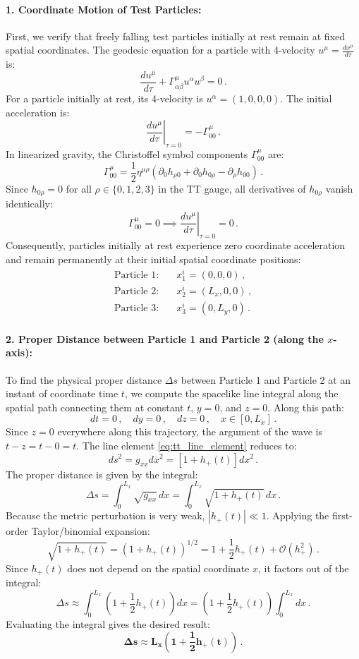 \documentclass[12pt]{article}
\newcommand{\be}{\begin{equation}}
\newcommand{\ee}{\end{equation}}
\begin{document}
\paragraph{1. Coordinate Motion of Test Particles:}
First, we verify that freely falling test particles initially at rest remain at fixed spatial coordinates. 
The geodesic equation for a particle with 4-velocity $u^\mu = \frac{dx^\mu}{d\tau}$ is:
\be
\frac{du^\mu}{d\tau} + \Gamma^\mu_{\alpha\beta} u^\alpha u^\beta = 0 \,.
\ee
For a particle initially at rest, its 4-velocity is $u^\alpha = (1, 0, 0, 0)$. The initial acceleration is:
\be
\left. \frac{du^\mu}{d\tau} \right|_{\tau=0} = - \Gamma^\mu_{00} \,.
\ee
In linearized gravity, the Christoffel symbol components $\Gamma^\mu_{00}$ are:
\be
\Gamma^\mu_{00} = \frac{1}{2} \eta^{\mu\rho} \left( \partial_0 h_{\rho 0} + \partial_0 h_{0\rho} - \partial_\rho h_{00} \right) \,.
\ee
Since $h_{0\rho} = 0$ for all $\rho \in \{0,1,2,3\}$ in the TT gauge, all derivatives of $h_{0\rho}$ vanish identically:
\be
\Gamma^\mu_{00} = 0 \implies \left. \frac{du^\mu}{d\tau} \right|_{\tau=0} = 0 \,.
\ee
Consequently, particles initially at rest experience zero coordinate acceleration and remain permanently at their initial spatial coordinate positions:
\begin{align}
\text{Particle 1:} \quad &x_1^i = (0, 0, 0) \,, \\
\text{Particle 2:} \quad &x_2^i = (L_x, 0, 0) \,, \\
\text{Particle 3:} \quad &x_3^i = (0, L_y, 0) \,.
\end{align}

\paragraph{2. Proper Distance between Particle 1 and Particle 2 (along the $x$-axis):}
To find the physical proper distance $\Delta s$ between Particle 1 and Particle 2 at an instant of coordinate time $t$, we compute the spacelike line integral along the spatial path connecting them at constant $t$, $y = 0$, and $z = 0$.
Along this path:
\be
dt = 0 \,, \quad dy = 0 \,, \quad dz = 0 \,, \quad x \in [0, L_x] \,.
\ee
Since $z = 0$ everywhere along this trajectory, the argument of the wave is $t - z = t - 0 = t$.
The line element \eqref{eq:tt_line_element} reduces to:
\be
ds^2 = g_{xx} dx^2 = \left[ 1 + h_+(t) \right] dx^2 \,.
\ee
The proper distance is given by the integral:
\be
\Delta s = \int_0^{L_x} \sqrt{g_{xx}} \, dx = \int_0^{L_x} \sqrt{1 + h_+(t)} \, dx \,.
\ee
Because the metric perturbation is very weak, $|h_+(t)| \ll 1$. Applying the first-order Taylor/binomial expansion:
\be
\sqrt{1 + h_+(t)} = \left( 1 + h_+(t) \right)^{1/2} = 1 + \frac{1}{2} h_+(t) + \mathcal{O}(h_+^2) \,.
\ee
Since $h_+(t)$ does not depend on the spatial coordinate $x$, it factors out of the integral:
\be
\Delta s \approx \int_0^{L_x} \left( 1 + \frac{1}{2} h_+(t) \right) dx = \left( 1 + \frac{1}{2} h_+(t) \right) \int_0^{L_x} dx \,.
\ee
Evaluating the integral gives the desired result:
\be
\mathbf{\Delta s \approx L_x \left( 1 + \frac{1}{2} h_{+}(t) \right)} \,.
\ee
\end{document}
